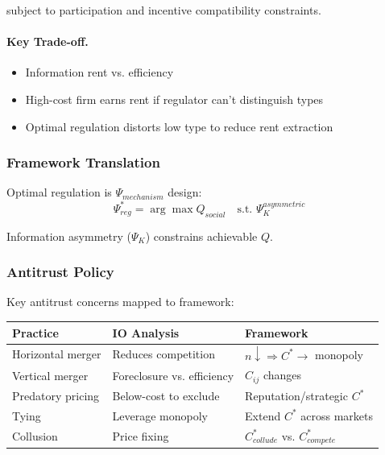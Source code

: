 subject to participation and incentive compatibility constraints.

\paragraph{Key Trade-off.}
\begin{itemize}
    \item Information rent vs. efficiency
    \item High-cost firm earns rent if regulator can't distinguish types
    \item Optimal regulation distorts low type to reduce rent extraction
\end{itemize}

\subsubsection{Framework Translation}

Optimal regulation is $\Psi_{mechanism}$ design:
\begin{equation}
\Psi^*_{reg} = \arg\max Q_{social} \quad \text{s.t. } \Psi_K^{asymmetric}
\end{equation}

Information asymmetry ($\Psi_K$) constrains achievable $Q$.

\subsubsection{Antitrust Policy}

Key antitrust concerns mapped to framework:

\begin{center}
\renewcommand{\arraystretch}{1.3}
\begin{tabular}{|l|l|l|}
\hline
\textbf{Practice} & \textbf{IO Analysis} & \textbf{Framework} \\
\hline
Horizontal merger & Reduces competition & $n \downarrow \Rightarrow C^* \to$ monopoly \\
Vertical merger & Foreclosure vs. efficiency & $C_{ij}$ changes \\
Predatory pricing & Below-cost to exclude & Reputation/strategic $C^*$ \\
Tying & Leverage monopoly & Extend $C^*$ across markets \\
Collusion & Price fixing & $C^*_{collude}$ vs. $C^*_{compete}$ \\
\hline
\end{tabular}
\end{center}

